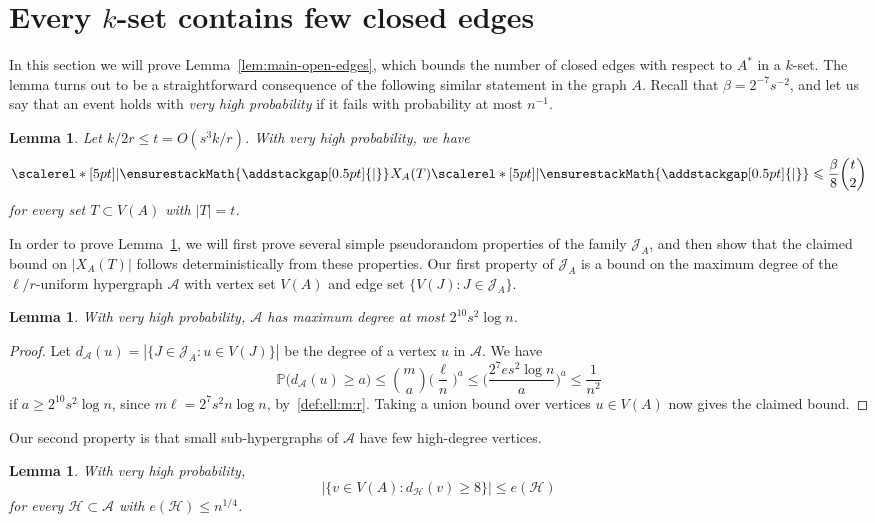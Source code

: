 \documentclass[12pt,reqno]{amsart}
\newcommand\pig[1]{\scalerel*[5pt]{\normalsize#1}{%
  \ensurestackMath{\addstackgap[0.5pt]{\normalsize#1}}}}
\newtheorem{lemma}[theorem]{Lemma}
\theoremstyle{remark}
\numberwithin{theorem}{section}
\renewcommand{\(}{\bigl(}
\renewcommand{\)}{\bigr)\vphantom{)}}
\newcommand{\cA}{\mathcal A}
\newcommand{\cH}{\mathcal H}
\newcommand{\cJ}{\mathcal J}
\renewcommand{\le}{\leqslant}
\renewcommand{\ge}{\geqslant}
\renewcommand{\Pr}{\mathbb{P}}
\begin{document}
\section{Every $k$-set contains few closed edges}\label{sec:open:edges}

In this section we will prove Lemma~\ref{lem:main-open-edges}, which bounds the number of closed edges with respect to $A^*$ in a $k$-set. The lemma turns out to be a straightforward consequence of the following similar statement in the graph $A$. Recall that $\beta = 2^{-7} s^{-2}$, and let us say that an event holds with \emph{very high probability} if it fails with probability at most $n^{-1}$.

\begin{lemma}\label{lem:A-open-edges} 
Let $k/2r \le t = O(s^3 k/r)$. With very high probability, we have 
$$\pig| \hspace{0.015cm} X_A(T) \pig| \le \frac{\beta}{8} {t \choose 2}$$
for every set $T \subset V(A)$ with $|T| = t$.
\end{lemma}

In order to prove Lemma~\ref{lem:A-open-edges}, we will first prove several simple pseudorandom properties of the family $\cJ_A$, and then show that the claimed bound on $|X_A(T)|$ follows deterministically from these properties. Our first property of $\cJ_A$ is a bound on the maximum degree of the $\ell/r$-uniform hypergraph $\cA$ with vertex set $V(A)$ and edge set $\big\{ V(J) : J \in \cJ_A \big\}$. 

\begin{lemma}\label{obs:deg}
With very high probability, $\cA$ has maximum degree at most $2^{10} s^2 \log n$.
\end{lemma}

\begin{proof}
Let $d_\cA(u) = |\{ J \in \cJ_A : u \in V(J) \}|$ be the degree of a vertex $u$ in $\cA$. We have 
$$\Pr\big( d_\cA(u) \ge a \big) \le \binom{m}{a} \bigg(\frac{\ell}{n}\bigg)^{a} \le \bigg(\frac{2^{7} e s^2 \log n}{a} \bigg)^a \le \frac{1}{n^2}$$
if $a \ge 2^{10} s^2 \log n$, since $m \ell = 2^7 s^2 n \log n$, by~\eqref{def:ell:m:r}.  
Taking a union bound over vertices $u \in V(A)$ now gives the claimed bound. 
\end{proof}

Our second property is that small sub-hypergraphs of $\cA$ have few high-degree vertices.  

\begin{lemma}\label{lem:few:vtxs:many:nbrs}
With very high probability, 
$$\big|\big\{ v \in V(A) : d_\cH(v) \ge 8 \big\}\big| \le e(\cH)$$
for every $\cH \subset \cA$ with $e(\cH) \le n^{1/4}$. 
\end{lemma} 
\end{document}
